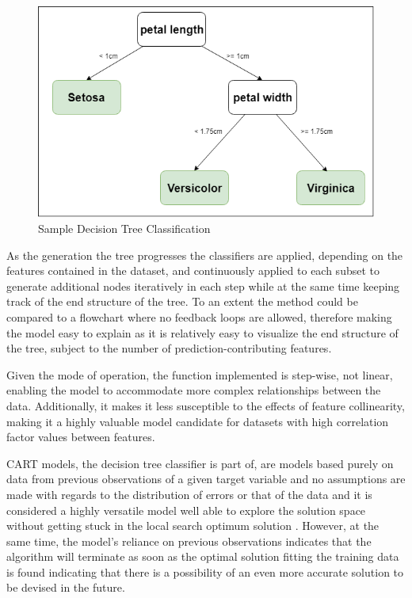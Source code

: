 \begin{figure}[!h]
    \centering
    \includegraphics[scale=0.6]{Figures/decision_tree_sample.png}
    \caption{Sample Decision Tree Classification}
    \label{fig:decision-tree-sample}
\end{figure}

As the generation the tree progresses the classifiers are applied, depending on the features contained in the dataset, and continuously applied to each subset to generate additional nodes iteratively \cite{Bertsimas2017Cart} in each step while at the same time keeping track of the end structure of the tree. To an extent the method could be compared to a flowchart where no feedback loops are allowed, therefore making the model easy to explain as it is relatively easy to visualize the end structure of the tree, subject to the number of prediction-contributing features.

Given the mode of operation, the function implemented is step-wise, not linear, enabling the model to accommodate more complex relationships between the data. 
Additionally, it makes it less susceptible to the effects of feature collinearity, making it a highly valuable model candidate for datasets with high correlation factor values between features.

CART models, the decision tree classifier is part of, are models based purely on data from previous observations \cite{breimanCart1984} of a given target variable and no assumptions are made with regards to the distribution of errors or that of the data and it is considered a highly versatile model \cite{ensembleMethodsInMachineLearningDietterich} well able to explore the solution space without getting stuck in the local search optimum solution \cite{ensembleMethodsInMachineLearningDietterich}. However, at the same time, the model's reliance on previous observations indicates that the algorithm will terminate as soon as the optimal solution fitting the training data is found \cite{ensembleMethodsInMachineLearningDietterich} indicating that there is a possibility of an even more accurate solution to be devised in the future.

